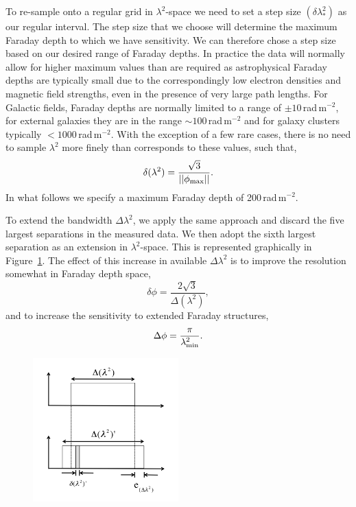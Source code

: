 \documentclass[fleqn,usenatbib]{mnras}
\begin{document}
To re-sample onto a regular grid in $\lambda^2$-space we need to set a step size $(\delta \lambda_{\ast}^2)$ as our regular interval. The step size that we choose will determine the maximum Faraday depth to which we have sensitivity. We can therefore chose a step size based on our desired range of Faraday depths. In practice the data will normally allow for higher maximum values than are required as astrophysical Faraday depths are typically small due to the correspondingly low electron densities and magnetic field strengths, even in the presence of very large path lengths. For Galactic fields, Faraday depths are normally limited to a range of $\pm10$\,rad\,m$^{-2}$, for external galaxies they are in the range $\sim100$\,rad\,m$^{-2}$ and for galaxy clusters typically $<1000$\,rad\,m$^{-2}$. With the exception of a few rare cases, there is no need to sample $\lambda^2$ more finely than corresponds to these values, such that,
%
\begin{equation}
 \delta (\lambda^2) = \frac{\sqrt{3}}{||\phi_{\rm max}||}.
\end{equation}
%
In what follows we specify a maximum Faraday depth of 200\,rad\,m$^{-2}$.

To extend the bandwidth $\Delta \lambda^2$, we apply the same approach and discard the five largest separations in the measured data. We then adopt the sixth largest separation as an extension in $\lambda^2$-space. This is represented graphically in Figure~\ref{fig:resampling}. The effect of this increase in available $\Delta \lambda^2$ is to improve the resolution somewhat in Faraday depth space,
%
\begin{equation}
\delta \phi = \frac{2\sqrt{3}}{\Delta (\lambda^2)},
\end{equation}
%
and to increase the sensitivity to extended Faraday structures,
%
\begin{equation}
\Delta \phi = \frac{\pi}{\lambda_{\rm min}^2}.
\end{equation}

\begin{figure}
\caption{\label{fig:resampling}}
\includegraphics[width=0.5\textwidth]{./FIGURES/faraday_resampling.png}
\end{figure}
\end{document}
